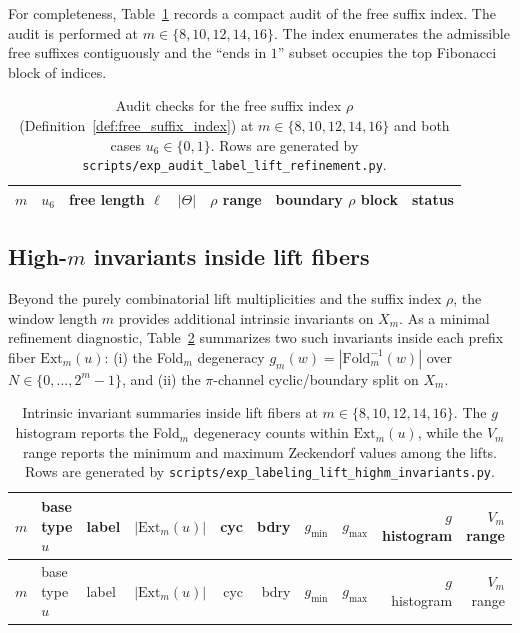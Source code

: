 For completeness, Table~\ref{tab:label_lift_refinement_audit} records a compact audit of the free suffix index.
The audit is performed at $m\in\{8,10,12,14,16\}$.
The index enumerates the admissible free suffixes contiguously and the ``ends in $1$'' subset occupies the top Fibonacci block of indices.

\begin{table}[H]
\centering
\scriptsize
\setlength{\tabcolsep}{6pt}
\renewcommand{\arraystretch}{1.15}
\begin{tabular}{rrrrlll}
\toprule
$m$ & $u_6$ & free length $\ell$ & $|\Theta|$ & $\rho$ range & boundary $\rho$ block & status \\
\midrule
%
\end{tabular}
\caption{Audit checks for the free suffix index $\rho$ (Definition~\ref{def:free_suffix_index}) at $m\in\{8,10,12,14,16\}$ and both cases $u_6\in\{0,1\}$. Rows are generated by \texttt{scripts/exp\_audit\_label\_lift\_refinement.py}.}
\label{tab:label_lift_refinement_audit}
\end{table}

\subsection{High-\texorpdfstring{$m$}{m} invariants inside lift fibers}
\label{subsec:lift_highm_invariants}

Beyond the purely combinatorial lift multiplicities and the suffix index $\rho$, the window length $m$ provides additional intrinsic invariants on $X_m$.
As a minimal refinement diagnostic, Table~\ref{tab:label_lift_highm_invariants} summarizes two such invariants inside each prefix fiber $\mathrm{Ext}_m(u)$:
(i) the Fold$_m$ degeneracy $g_m(w)=|\mathrm{Fold}_m^{-1}(w)|$ over $N\in\{0,\dots,2^m-1\}$, and
(ii) the $\pi$-channel cyclic/boundary split on $X_m$.

\begin{center}
\scriptsize
\setlength{\tabcolsep}{4pt}
\renewcommand{\arraystretch}{1.15}
\begin{longtable}{rllrrrrrrr}
\caption{Intrinsic invariant summaries inside lift fibers at $m\in\{8,10,12,14,16\}$. The $g$ histogram reports the Fold$_m$ degeneracy counts within $\mathrm{Ext}_m(u)$, while the $V_m$ range reports the minimum and maximum Zeckendorf values among the lifts. Rows are generated by \texttt{scripts/exp\_labeling\_lift\_highm\_invariants.py}.}
\label{tab:label_lift_highm_invariants}\\
\toprule
$m$ & base type $u$ & label & $|\mathrm{Ext}_m(u)|$ & cyc & bdry & $g_{\min}$ & $g_{\max}$ & $g$ histogram & $V_m$ range \\
\midrule
\endfirsthead
\toprule
$m$ & base type $u$ & label & $|\mathrm{Ext}_m(u)|$ & cyc & bdry & $g_{\min}$ & $g_{\max}$ & $g$ histogram & $V_m$ range \\
\midrule
\endhead
%
\end{longtable}
\end{center}




